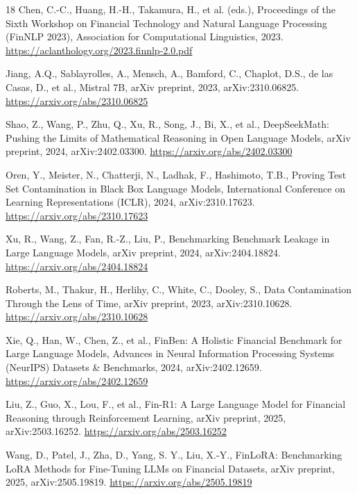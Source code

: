 \documentclass[a4paper]{article}
\begin{document}
\begin{thebibliography}{18}
Chen, C.-C., Huang, H.-H., Takamura, H., et al. (eds.), Proceedings of the Sixth Workshop on Financial Technology and Natural Language Processing (FinNLP 2023), Association for Computational Linguistics, 2023. \url{https://aclanthology.org/2023.finnlp-2.0.pdf}

Jiang, A.Q., Sablayrolles, A., Mensch, A., Bamford, C., Chaplot, D.S., de las Casas, D., et al., Mistral 7B, arXiv preprint, 2023, arXiv:2310.06825. \url{https://arxiv.org/abs/2310.06825}

Shao, Z., Wang, P., Zhu, Q., Xu, R., Song, J., Bi, X., et al., DeepSeekMath: Pushing the Limits of Mathematical Reasoning in Open Language Models, arXiv preprint, 2024, arXiv:2402.03300. \url{https://arxiv.org/abs/2402.03300}

Oren, Y., Meister, N., Chatterji, N., Ladhak, F., Hashimoto, T.B., Proving Test Set Contamination in Black Box Language Models, International Conference on Learning Representations (ICLR), 2024, arXiv:2310.17623. \url{https://arxiv.org/abs/2310.17623}

Xu, R., Wang, Z., Fan, R.-Z., Liu, P., Benchmarking Benchmark Leakage in Large Language Models, arXiv preprint, 2024, arXiv:2404.18824. \url{https://arxiv.org/abs/2404.18824}

Roberts, M., Thakur, H., Herlihy, C., White, C., Dooley, S., Data Contamination Through the Lens of Time, arXiv preprint, 2023, arXiv:2310.10628. \url{https://arxiv.org/abs/2310.10628}

Xie, Q., Han, W., Chen, Z., et al., FinBen: A Holistic Financial Benchmark for Large Language Models, Advances in Neural Information Processing Systems (NeurIPS) Datasets \& Benchmarks, 2024, arXiv:2402.12659. \url{https://arxiv.org/abs/2402.12659}

Liu, Z., Guo, X., Lou, F., et al., Fin-R1: A Large Language Model for Financial Reasoning through Reinforcement Learning, arXiv preprint, 2025, arXiv:2503.16252. \url{https://arxiv.org/abs/2503.16252}

Wang, D., Patel, J., Zha, D., Yang, S. Y., Liu, X.-Y., FinLoRA: Benchmarking LoRA Methods for Fine-Tuning LLMs on Financial Datasets, arXiv preprint, 2025, arXiv:2505.19819. \url{https://arxiv.org/abs/2505.19819}

\end{thebibliography}
\end{document}
